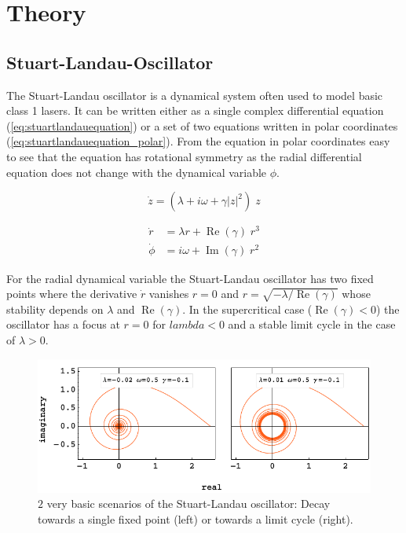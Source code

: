 \section{Theory}

	\subsection{Stuart-Landau-Oscillator}
	The Stuart-Landau oscillator is a dynamical system often used to model basic class 1 lasers. It can be written either as a single complex differential equation (\ref{eq:stuartlandauequation}) or a set of two equations written in polar coordinates (\ref{eq:stuartlandauequation_polar}). From the equation in polar coordinates easy to see that the equation has rotational symmetry as the radial differential equation does not change with the dynamical variable $\phi$.
	
	\begin{equation}	
		\dot{z} = (\lambda +  i \omega + \gamma |z|^2 ) \; z
		\label{eq:stuartlandauequation}		
	\end{equation}
	
	\begin{equation}
		\begin{split}
		\dot{r} & = \lambda r + \operatorname{Re} (\gamma) \; r^{3} \\
		\dot{\phi} &= i \omega + \operatorname{Im}(\gamma) \; r^{2} 
		\end{split}
		\label{eq:stuartlandauequation_polar}
	\end{equation}

	For the radial dynamical variable the Stuart-Landau oscillator has two fixed points where the derivative $\dot{r}$ vanishes $r = 0$ and $r = \sqrt{-\lambda /\operatorname{Re}(\gamma)}$ whose stability depends on $\lambda$ and $\operatorname{Re}(\gamma)$. In the supercritical case ($\operatorname{Re}(\gamma) < 0 $) the oscillator has a focus at $r=0$ for $lambda < 0$ and a stable limit cycle in the case of $\lambda > 0$.  

	\begin{figure}
		\centering
		\includegraphics[width=0.99\linewidth]{pics/stuart_landau_complex_Focus_LC}
		\caption{$2$ very basic scenarios of the Stuart-Landau oscillator: Decay towards a single fixed point (left) or towards a limit cycle (right).}
		\label{fig:stuart_spiral}
	\end{figure}



